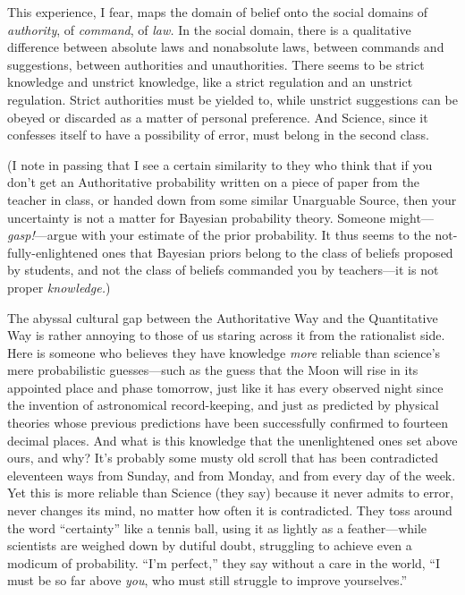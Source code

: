 {
 This experience, I fear, maps the domain of belief onto the social
domains of \textit{authority}, of \textit{command}, of \textit{law.} In
the social domain, there is a qualitative difference between absolute
laws and nonabsolute laws, between commands and suggestions, between
authorities and unauthorities. There seems to be strict knowledge and
unstrict knowledge, like a strict regulation and an unstrict
regulation. Strict authorities must be yielded to, while unstrict
suggestions can be obeyed or discarded as a matter of personal
preference. And Science, since it confesses itself to have a
possibility of error, must belong in the second class.}

{
 (I note in passing that I see a certain similarity to they who
think that if you don't get an Authoritative
probability written on a piece of paper from the teacher in class, or
handed down from some similar Unarguable Source, then your uncertainty
is not a matter for Bayesian probability theory. Someone
might---\textit{gasp!}{}---argue with your estimate of the prior
probability. It thus seems to the not-fully-enlightened ones that
Bayesian priors belong to the class of beliefs proposed by students,
and not the class of beliefs commanded you by teachers---it is not
proper \textit{knowledge.})}

{
 The abyssal cultural gap between the Authoritative Way and the
Quantitative Way is rather annoying to those of us staring across it
from the rationalist side. Here is someone who believes they have
knowledge \textit{more} reliable than science's mere
probabilistic guesses---such as the guess that the Moon will rise in
its appointed place and phase tomorrow, just like it has every observed
night since the invention of astronomical record-keeping, and just as
predicted by physical theories whose previous predictions have been
successfully confirmed to fourteen decimal places. And what is this
knowledge that the unenlightened ones set above ours, and why?
It's probably some musty old scroll that has been
contradicted eleventeen ways from Sunday, and from Monday, and from
every day of the week. Yet this is more reliable than Science (they
say) because it never admits to error, never changes its mind, no
matter how often it is contradicted. They toss around the word
``certainty'' like a tennis ball,
using it as lightly as a feather---while scientists are weighed down by
dutiful doubt, struggling to achieve even a modicum of probability.
``I'm perfect,''
they say without a care in the world, ``I must be so
far above \textit{you}, who must still struggle to improve
yourselves.''}

